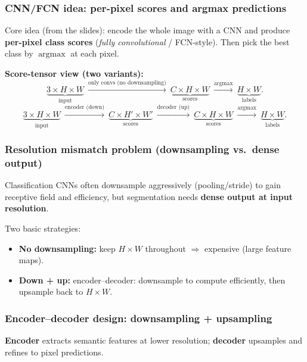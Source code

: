\documentclass[11pt,a4paper]{article}
\DeclareMathOperator*{\argmax}{argmax}
\begin{document}
\subsubsection{CNN/FCN idea: per-pixel scores and argmax predictions}
\begin{intbox}
Core idea (from the slides): encode the whole image with a CNN and produce \textbf{per-pixel class scores}
(\emph{fully convolutional} / FCN-style). Then pick the best class by $\argmax$ at each pixel.
\end{intbox}

\begin{mathrule}
\textbf{Score-tensor view (two variants):}\quad
\[
\underbrace{3\times H\times W}_{\text{input}}
\ \xrightarrow{\text{only convs (no downsampling)}}\
\underbrace{C\times H\times W}_{\text{scores}}
\ \xrightarrow{\argmax}\
\underbrace{H\times W}_{\text{labels}}.
\]
\[
\underbrace{3\times H\times W}_{\text{input}}
\ \xrightarrow{\text{encoder (down)}}\
\underbrace{C\times H'\times W'}_{\text{scores}}
\ \xrightarrow{\text{decoder (up)}}\
\underbrace{C\times H\times W}_{\text{scores}}
\ \xrightarrow{\argmax}\
\underbrace{H\times W}_{\text{labels}}.
\]
\end{mathrule}

\subsubsection{Resolution mismatch problem (downsampling vs.\ dense output)}
\begin{defbox}
Classification CNNs often downsample aggressively (pooling/stride) to gain receptive field and efficiency,
but segmentation needs \textbf{dense output at input resolution}.
\end{defbox}

Two basic strategies:
\begin{itemize}
  \item \textbf{No downsampling:} keep $H\times W$ throughout $\Rightarrow$ expensive (large feature maps).
  \item \textbf{Down + up:} encoder--decoder: downsample to compute efficiently, then upsample back to $H\times W$.
\end{itemize}

\subsubsection{Encoder--decoder design: downsampling + upsampling}
\begin{defbox}
\textbf{Encoder} extracts semantic features at lower resolution; \textbf{decoder} upsamples and refines to pixel predictions.
\end{defbox}
\end{document}
